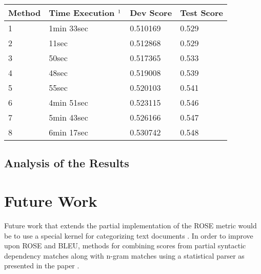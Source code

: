 \documentclass[11pt,letterpaper]{article}
\begin{document}
\begin{center}
	\begin{tabular}{| l | l | l | l |}
	\hline
	Method & Time Execution $\footnotemark[1] $& Dev Score & Test Score \\ \hline
	1 & 1min 33sec & 0.510169 & 0.529 \\ \hline
	2 & 11sec & 0.512868 & 0.529 \\ \hline
	3 & 50sec & 0.517365 & 0.533 \\ \hline
	4 & 48sec & 0.519008 & 0.539 \\ \hline
	5 & 55sec & 0.520103 & 0.541 \\ \hline
	6 & 4min 51sec & 0.523115 & 0.546 \\ \hline
	7 & 5min 43sec & 0.526166 & 0.547 \\ \hline
	8 & 6min 17sec & 0.530742 & 0.548 \\ \hline
	\end{tabular}
\end{center}

\subsection{Analysis of the Results}

\section{Future Work}
Future work that extends the partial implementation of the ROSE metric would be to use a special kernel for categorizing text documents \cite{lodhi2002text}. In order to improve upon ROSE and BLEU, methods for combining scores from partial syntactic dependency matches along with n-gram matches using a statistical parser as presented in the paper \cite{kahn2009expected}.



\end{document}
